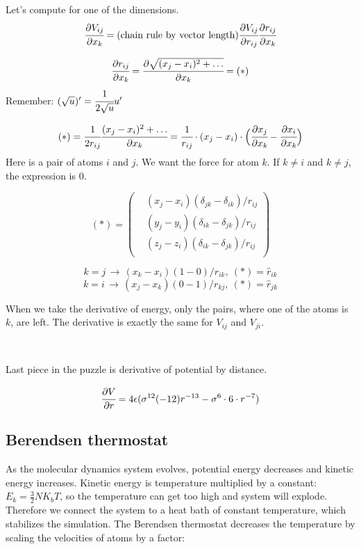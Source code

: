 \documentclass[12pt,a4paper]{article}
\newcommand{\infers}{\,\to\,}
\newcommand{\mat}[1]{\overline{#1}}
\newcommand{\framed}[1]{\tikz[baseline=(char.base)]{\node[shape=rectangle,draw,inner sep=4pt] (char) {#1};}}
\begin{document}
Let's compute for one of the dimensions.
\[
\cfrac{\partial V_{ij}}{\partial x_k} = \text{(chain rule by vector length)} \cfrac{\partial V_{ij}}{\partial r_{ij}} \cfrac{\partial r_{ij}}{\partial x_k}
\]

\[ \cfrac{\partial r_{ij}}{\partial x_k} = \cfrac{\partial \sqrt{(x_j-x_i)^2 + \ldots}}{\partial x_k} = (*) \]
Remember: \( (\sqrt{u})' = \cfrac{1}{2\sqrt{u}} u' \)

\[
(*) = \cfrac{1}{2r_{ij}} \cfrac{(x_j-x_i)^2+\ldots}{\partial x_k} = \cfrac{1}{r_{ij}} \cdot (x_j-x_i) \cdot \Bigl(\cfrac{\partial x_j}{\partial x_k} - \cfrac{\partial x_i}{\partial x_k}\Bigr)
\]
Here is a pair of atoms $i$ and $j$. We want the force for atom $k$. If \(k\neq i\) and \(k\neq j\), the expression is 0.

\[
(*) = \left( \begin{aligned}
	& (x_j - x_i) (\delta_{jk} - \delta_{ik}) / r_{ij} \\
	& (y_j - y_i) (\delta_{ik} - \delta_{jk}) / r_{ij} \\
	& (z_j - z_i) (\delta_{ik} - \delta_{jk}) / r_{ij} \\
\end{aligned} \right) 
\]

\[
k=j \infers (x_k-x_i)(1-0)/r_{ik},\ (*) = {\hat r_{ik}}
\]
\[
k=i \infers (x_j-x_k)(0-1)/r_{kj},\ (*) = {\hat r_{jk}}
\]

When we take the derivative of energy, only the pairs, where one of the atoms is \(k\), are left. The derivative is exactly the same for \(V_{ij}\) and \(V_{ji}\).

{\centering\framed{ \( \mat{f}_k = - \sum_i \cfrac{\partial V}{\partial r} {\hat r_{ik}} \) }\\}

Last piece in the puzzle is derivative of potential by distance.

\[
\cfrac{\partial V}{\partial r} = 4\epsilon (\sigma^{12} (-12) r^{-13} - \sigma^6\cdot 6\cdot r^{-7})
\]

\subsection*{Berendsen thermostat}

As the molecular dynamics system evolves, potential energy decreases and kinetic energy increases. Kinetic energy is temperature multiplied by a constant: $E_k = \frac{3}{2} NK_b T$, so the temperature can get too high and system will explode. Therefore we connect the system to a heat bath of constant temperature, which stabilizes the simulation. The Berendsen thermostat \cite{berendsen} decreases the temperature by scaling the velocities of atoms by a factor:
\end{document}
